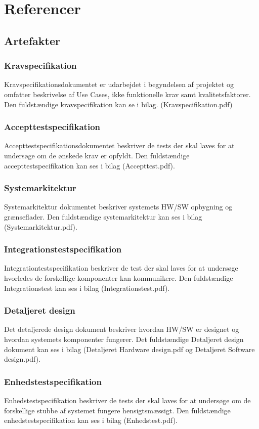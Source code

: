 \chapter{Referencer}
\section{Artefakter}
\subsection{Kravspecifikation}
Kravspecifikationsdokumentet er udarbejdet i begyndelsen af projektet og omfatter beskrivelse af Use Cases, ikke funktionelle krav samt kvalitetsfaktorer. Den fuldstændige kravspecifikation kan se i bilag. (Kravspecifikation.pdf)

\subsection{Accepttestspecifikation}
Accepttestspecifikationsdokumentet beskriver de tests der skal laves for at undersøge om de ønskede krav er opfyldt. Den fuldstændige accepttestspecifikation kan ses i bilag (Accepttest.pdf).

\subsection{Systemarkitektur}
Systemarkitektur dokumentet beskriver systemets HW/SW opbygning og grænseflader. Den fuldstændige systemarkitektur kan ses i bilag (Systemarkitektur.pdf).

\subsection{Integrationstestspecifikation}
Integrationtestspecifikation beskriver de test der skal laves for at undersøge hvorledes de forskellige komponenter kan kommunikere. Den fuldstændige Integrationstest kan ses i bilag (Integrationstest.pdf).

\subsection{Detaljeret design}
Det detaljerede design dokument beskriver hvordan HW/SW er designet og hvordan systemets komponenter fungerer. Det fuldstændige Detaljeret design dokument kan ses i bilag (Detaljeret Hardware design.pdf og Detaljeret Software design.pdf).

\subsection{Enhedstestspecifikation}
Enhedstestspecifikation beskriver de tests der skal laves for at undersøge om de forskellige stubbe af systemet fungere hensigtsmæssigt. Den fuldstændige enhedstestspecifikation kan ses i bilag (Enhedstest.pdf).

